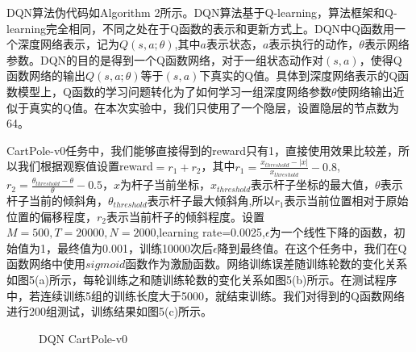 \documentclass[a4paper,UTF8]{article}
\theoremstyle{definition}
\begin{document}
	DQN算法伪代码如Algorithm 2所示。DQN算法基于Q-learning，算法框架和Q-learning完全相同，不同之处在于Q函数的表示和更新方式上。DQN中Q函数用一个深度网络表示，记为$Q(s,a;\theta)$,其中$a$表示状态，$a$表示执行的动作，$\theta$表示网络参数。DQN的目的是得到一个Q函数网络，对于一组状态动作对$(s,a)$，使得Q函数网络的输出$Q(s,a;\theta)$等于$(s,a)$下真实的Q值。具体到深度网络表示的Q函数模型上，Q函数的学习问题转化为了如何学习一组深度网络参数$\theta$使网络输出近似于真实的Q值。在本次实验中，我们只使用了一个隐层，设置隐层的节点数为64。

	CartPole-v0任务中，我们能够直接得到的reward只有1，直接使用效果比较差，所以我们根据观察值设置reward$=r_1+r_2$，其中$r_1=\frac{x_{threshold}-|x|}{x_{threshold}}-0.8$,$r_2=\frac{\theta_{threshold}-\theta}{\theta}-0.5$，$x$为杆子当前坐标，$x_{threshold}$表示杆子坐标的最大值，$\theta$表示杆子当前的倾斜角，$\theta_{threshold}$表示杆子最大倾斜角,所以$r_1$表示当前位置相对于原始位置的偏移程度，$r_2$表示当前杆子的倾斜程度。设置$M=500,T=20000,N=2000$,learning rate=0.0025,$\epsilon$为一个线性下降的函数，初始值为1，最终值为0.001，训练10000次后$\epsilon$降到最终值。在这个任务中，我们在Q函数网络中使用$sigmoid$函数作为激励函数。网络训练误差随训练轮数的变化关系如图5(a)所示，每轮训练之和随训练轮数的变化关系如图5(b)所示。在测试程序中，若连续训练5组的训练长度大于5000，就结束训练。我们对得到的Q函数网络进行200组测试，训练结果如图5(c)所示。

\begin{figure}[!h]
	\centering
	\caption{DQN CartPole-v0}

\end{figure}
\end{document}
